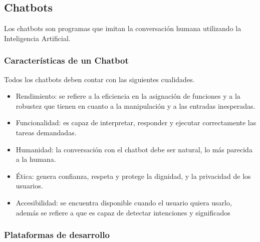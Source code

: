 \subsection{Chatbots}
Los chatbots son programas que imitan la conversación humana utilizando la Inteligencia Artificial.\cite{UniversityRelatedFAQS}
\subsubsection{Características de un Chatbot}
Todos los chatbots deben contar con las siguientes cualidades. \cite{evaluating_quality}
\begin{itemize}
    \item Rendimiento: se refiere a la eficiencia en la asignación de funciones y a la robustez que tienen en cuanto a la manipulación y a las entradas inesperadas.
    \item Funcionalidad: es capaz de interpretar, responder y ejecutar  correctamente las tareas demandadas.
    \item Humanidad: la conversación con el chatbot debe ser natural, lo más parecida a la humana.
    \item Ética: genera confianza, respeta y protege la dignidad, y la privacidad de los usuarios.
    \item Accesibilidad: se encuentra disponible cuando el usuario quiera usarlo, además se refiere a que es capaz de detectar intenciones y significados
\end{itemize}
\subsubsection{Plataformas de desarrollo}
